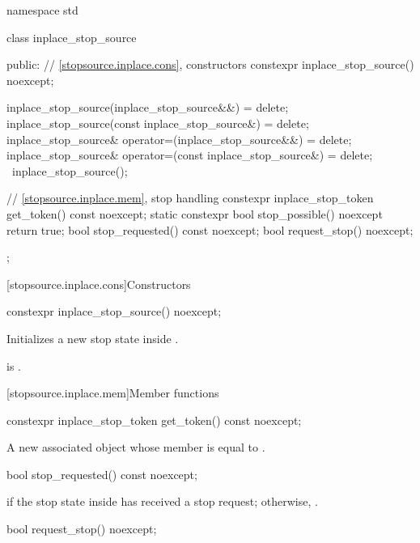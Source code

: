 \begin{codeblock}
namespace std {
  class inplace_stop_source {
  public:
    // \ref{stopsource.inplace.cons}, constructors
    constexpr inplace_stop_source() noexcept;

    inplace_stop_source(inplace_stop_source&&) = delete;
    inplace_stop_source(const inplace_stop_source&) = delete;
    inplace_stop_source& operator=(inplace_stop_source&&) = delete;
    inplace_stop_source& operator=(const inplace_stop_source&) = delete;
    ~inplace_stop_source();

    // \ref{stopsource.inplace.mem}, stop handling
    constexpr inplace_stop_token get_token() const noexcept;
    static constexpr bool stop_possible() noexcept { return true; }
    bool stop_requested() const noexcept;
    bool request_stop() noexcept;
  };
}
\end{codeblock}

[stopsource.inplace.cons]{Constructors}

\begin{itemdecl}
constexpr inplace_stop_source() noexcept;
\end{itemdecl}

\begin{itemdescr}
\pnum
\effects
Initializes a new stop state inside .

\pnum
\ensures
{} is .
\end{itemdescr}

[stopsource.inplace.mem]{Member functions}

\begin{itemdecl}
constexpr inplace_stop_token get_token() const noexcept;
\end{itemdecl}

\begin{itemdescr}
\pnum
\returns
A new associated  object
whose  member is equal to .
\end{itemdescr}

\begin{itemdecl}
bool stop_requested() const noexcept;
\end{itemdecl}

\begin{itemdescr}
\pnum
\returns
{} if the stop state inside 
has received a stop request; otherwise, .
\end{itemdescr}

\begin{itemdecl}
bool request_stop() noexcept;
\end{itemdecl}

